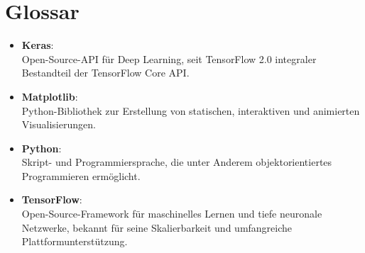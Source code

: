 
\nocite{*}						%
\cleardoublepage

\listoffigures
{}   %
\cleardoublepage

\listoftables
{}		%
\cleardoublepage

\lstlistoflistings
{}%
\cleardoublepage

\chapter*{Glossar}

\begin{itemize}
	\item \textbf{Keras}:\\ Open-Source-API für Deep Learning, seit TensorFlow 2.0 integraler Bestandteil der TensorFlow Core API.
	\item \textbf{Matplotlib}: \\  Python-Bibliothek zur Erstellung von statischen, interaktiven und animierten Visualisierungen.
	\item \textbf{Python}:\\ Skript- und Programmiersprache, die unter Anderem objektorientiertes Programmieren ermöglicht. 
	\item \textbf{TensorFlow}:\\  Open-Source-Framework für maschinelles Lernen und tiefe neuronale Netzwerke, bekannt für seine Skalierbarkeit und umfangreiche Plattformunterstützung.
\end{itemize} 